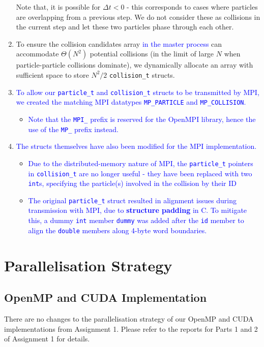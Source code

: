 \documentclass[12pt]{article}
\begin{document}
\begin{enumerate}
	Note that, it is possible for $\Delta t < 0$ - this corresponds to cases where particles are overlapping from a previous step. We do not consider these as collisions in the current step and let these two particles phase through each other.
	\item To ensure the collision candidates array \textcolor{blue}{in the master process} can accommodate $\Theta(N^2)$ potential collisions (in the limit of large $N$ when particle-particle collisions dominate), we dynamically allocate an array with sufficient space to store $N^2 / 2$ \texttt{collision\_t} structs.
	\item \textcolor{blue}{To allow our \texttt{particle\_t} and \texttt{collision\_t} structs to be transmitted by MPI, we created the matching MPI datatypes \texttt{MP\_PARTICLE} and \texttt{MP\_COLLISION}.}
	\begin{itemize}
	    \item \textcolor{blue}{Note that the \texttt{MPI\_} prefix is reserved for the OpenMPI library, hence the use of the \texttt{MP\_} prefix instead.}
	\end{itemize}
	\item \textcolor{blue}{The structs themselves have also been modified for the MPI implementation.}
	\begin{itemize}
	    \item \textcolor{blue}{Due to the distributed-memory nature of MPI, the \texttt{particle\_t} pointers in \texttt{collision\_t} are no longer useful - they have been replaced with two \texttt{int}s, specifying the particle(s) involved in the collision by their ID}
	    \item \textcolor{blue}{The original \texttt{particle\_t} struct resulted in alignment issues during transmission with MPI, due to \textbf{structure padding} in C. To mitigate this, a dummy \texttt{int} member \texttt{dummy} was added after the \texttt{id} member to align the \texttt{double} members along 4-byte word boundaries.}
	\end{itemize}
\end{enumerate} 

\pagebreak

\section{Parallelisation Strategy}

\subsection{OpenMP and CUDA Implementation}
There are no changes to the parallelisation strategy of our OpenMP and CUDA implementations from Assignment 1. Please refer to the reports for Parts 1 and 2 of Assignment 1 for details.
\end{document}
